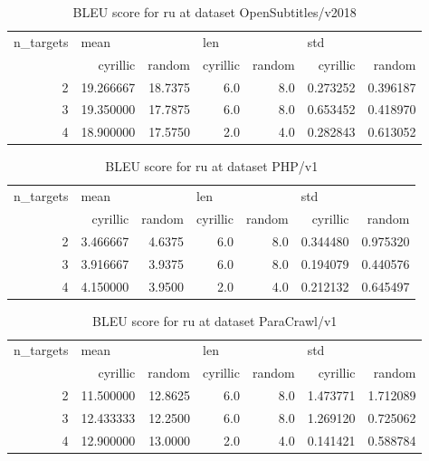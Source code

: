 \begin{table}[h]
\begin{tabular}{rrrrrrr}
\toprule
n\_targets & \multicolumn{2}{l}{mean} & \multicolumn{2}{l}{len} & \multicolumn{2}{l}{std} \\
          &   cyrillic &   random & cyrillic & random &  cyrillic &    random \\
\midrule
        2 &  19.266667 &  18.7375 &      6.0 &    8.0 &  0.273252 &  0.396187 \\
        3 &  19.350000 &  17.7875 &      6.0 &    8.0 &  0.653452 &  0.418970 \\
        4 &  18.900000 &  17.5750 &      2.0 &    4.0 &  0.282843 &  0.613052 \\
\bottomrule
\end{tabular}

\caption{BLEU score for  ru at dataset OpenSubtitles/v2018 }
\label{ table:ru/OpenSubtitles/v2018 }
\end{table}

\begin{table}[h]
\begin{tabular}{rrrrrrr}
\toprule
n\_targets & \multicolumn{2}{l}{mean} & \multicolumn{2}{l}{len} & \multicolumn{2}{l}{std} \\
          &  cyrillic &  random & cyrillic & random &  cyrillic &    random \\
\midrule
        2 &  3.466667 &  4.6375 &      6.0 &    8.0 &  0.344480 &  0.975320 \\
        3 &  3.916667 &  3.9375 &      6.0 &    8.0 &  0.194079 &  0.440576 \\
        4 &  4.150000 &  3.9500 &      2.0 &    4.0 &  0.212132 &  0.645497 \\
\bottomrule
\end{tabular}

\caption{BLEU score for  ru at dataset PHP/v1 }
\label{ table:ru/PHP/v1 }
\end{table}

\begin{table}[h]
\begin{tabular}{rrrrrrr}
\toprule
n\_targets & \multicolumn{2}{l}{mean} & \multicolumn{2}{l}{len} & \multicolumn{2}{l}{std} \\
          &   cyrillic &   random & cyrillic & random &  cyrillic &    random \\
\midrule
        2 &  11.500000 &  12.8625 &      6.0 &    8.0 &  1.473771 &  1.712089 \\
        3 &  12.433333 &  12.2500 &      6.0 &    8.0 &  1.269120 &  0.725062 \\
        4 &  12.900000 &  13.0000 &      2.0 &    4.0 &  0.141421 &  0.588784 \\
\bottomrule
\end{tabular}

\caption{BLEU score for  ru at dataset ParaCrawl/v1 }
\label{ table:ru/ParaCrawl/v1 }
\end{table}

